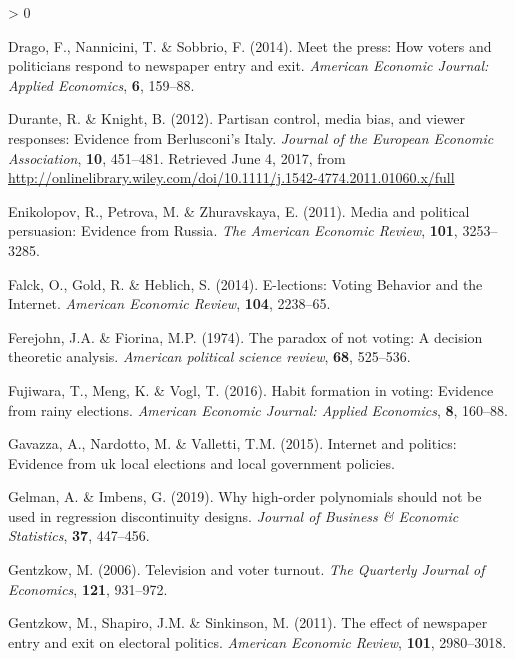 \documentclass[
  12pt,
]{article}
\newlength{\cslhangindent}
\newenvironment{CSLReferences}[2] %
 {%
  \setlength{\parindent}{0pt}
  \ifodd #1 \everypar{\setlength{\hangindent}{\cslhangindent}}\ignorespaces\fi
  \ifnum #2 > 0
  \setlength{\parskip}{#2\baselineskip}
  \fi
 }%
 {}
\begin{document}
\begin{CSLReferences}{1}{0}
\leavevmode\hypertarget{ref-drago_meet_2014}{}%
Drago, F., Nannicini, T. \& Sobbrio, F. (2014). Meet the press: {How}
voters and politicians respond to newspaper entry and exit.
\emph{American Economic Journal: Applied Economics}, \textbf{6},
159--88.

\leavevmode\hypertarget{ref-durante_partisan_2012}{}%
Durante, R. \& Knight, B. (2012). Partisan control, media bias, and
viewer responses: {Evidence} from {Berlusconi}'s {Italy}. \emph{Journal
of the European Economic Association}, \textbf{10}, 451--481. Retrieved
June 4, 2017, from
\url{http://onlinelibrary.wiley.com/doi/10.1111/j.1542-4774.2011.01060.x/full}

\leavevmode\hypertarget{ref-enikolopov_media_2011}{}%
Enikolopov, R., Petrova, M. \& Zhuravskaya, E. (2011). Media and
political persuasion: {Evidence} from {Russia}. \emph{The American
Economic Review}, \textbf{101}, 3253--3285.

\leavevmode\hypertarget{ref-falck_e-lections:_2014}{}%
Falck, O., Gold, R. \& Heblich, S. (2014). E-lections: {Voting}
{Behavior} and the {Internet}. \emph{American Economic Review},
\textbf{104}, 2238--65.

\leavevmode\hypertarget{ref-ferejohn_paradox_1974}{}%
Ferejohn, J.A. \& Fiorina, M.P. (1974). The paradox of not voting: {A}
decision theoretic analysis. \emph{American political science review},
\textbf{68}, 525--536.

\leavevmode\hypertarget{ref-fujiwara_habit_2016}{}%
Fujiwara, T., Meng, K. \& Vogl, T. (2016). Habit formation in voting:
{Evidence} from rainy elections. \emph{American Economic Journal:
Applied Economics}, \textbf{8}, 160--88.

\leavevmode\hypertarget{ref-gavazza_internet_2015}{}%
Gavazza, A., Nardotto, M. \& Valletti, T.M. (2015). Internet and
politics: {Evidence} from uk local elections and local government
policies.

\leavevmode\hypertarget{ref-gelman_why_2019}{}%
Gelman, A. \& Imbens, G. (2019). Why high-order polynomials should not
be used in regression discontinuity designs. \emph{Journal of Business
\& Economic Statistics}, \textbf{37}, 447--456.

\leavevmode\hypertarget{ref-gentzkow_television_2006}{}%
Gentzkow, M. (2006). Television and voter turnout. \emph{The Quarterly
Journal of Economics}, \textbf{121}, 931--972.

\leavevmode\hypertarget{ref-gentzkow_effect_2011}{}%
Gentzkow, M., Shapiro, J.M. \& Sinkinson, M. (2011). The effect of
newspaper entry and exit on electoral politics. \emph{American Economic
Review}, \textbf{101}, 2980--3018.


\end{CSLReferences}
\end{document}
